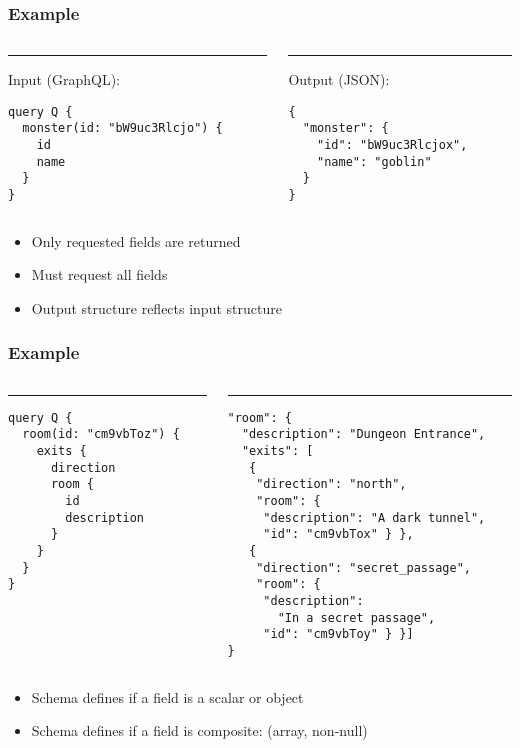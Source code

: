 \documentclass[lualatex]{beamer}
\begin{document}
\begin{frame}[fragile]
  \frametitle{Example}
\begin{columns}[T] %
\begin{column}{.5\textwidth}
\color{black}\rule{\linewidth}{1pt}
Input (GraphQL):
\begin{verbatim}
query Q {
  monster(id: "bW9uc3Rlcjo") {
    id
    name
  }
}
\end{verbatim}
\end{column}
\hfill
\begin{column}{.5\textwidth}
\color{gray}\rule{\linewidth}{1pt}
Output (JSON):
\begin{verbatim}
{
  "monster": {
    "id": "bW9uc3Rlcjox",
    "name": "goblin"
  }
}
\end{verbatim}
\end{column}%
\end{columns}
\begin{itemize}
\item Only requested fields are returned
\item Must request all fields
\item Output structure reflects input structure
\end{itemize}
\end{frame}

\begin{frame}[fragile]
  \frametitle{Example}
\begin{columns}[T] %
\begin{column}{.5\textwidth}
\color{black}\rule{\linewidth}{1pt}
\begin{verbatim}
query Q {
  room(id: "cm9vbToz") {
    exits {
      direction
      room {
        id
        description
      }
    }
  }
}
\end{verbatim}
\end{column}
\hfill
\begin{column}{.5\textwidth}
\color{gray}\rule{\linewidth}{1pt}
\begin{verbatim}
"room": {
  "description": "Dungeon Entrance",
  "exits": [
   {
    "direction": "north",
    "room": {
     "description": "A dark tunnel",
     "id": "cm9vbTox" } },
   {
    "direction": "secret_passage",
    "room": {
     "description":
       "In a secret passage",
     "id": "cm9vbToy" } }]
}
\end{verbatim}
\end{column}
\end{columns}
\begin{itemize}
\item Schema defines if a field is a scalar or object
\item Schema defines if a field is composite: (array, non-null)
\end{itemize}
\end{frame}
\end{document}
